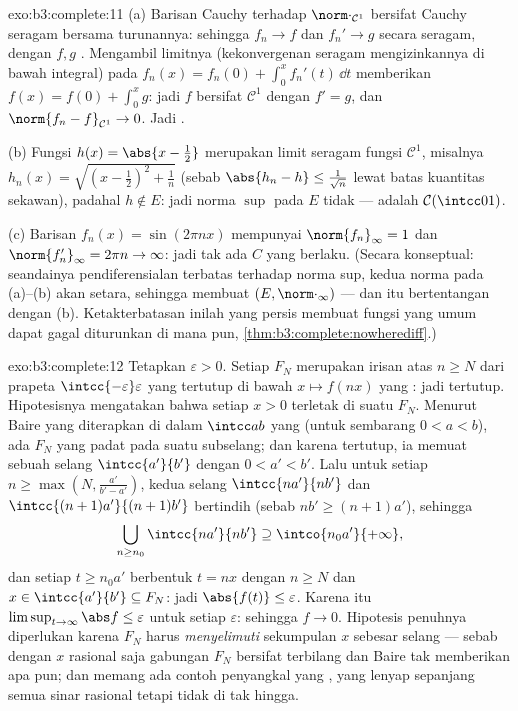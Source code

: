 \begin{solution}{exo:b3:complete:11}
(a) Barisan Cauchy terhadap $\norm\cdot_{\mathcal C^1}$ bersifat
Cauchy seragam bersama turunannya: sehingga $f_n \to f$
dan $f_n' \to g$ secara seragam, dengan $f, g$ . Mengambil
limitnya (kekonvergenan seragam mengizinkannya di bawah
integral) pada $f_n(x) = f_n(0) + \int_0^xf_n'(t)\,\dd t$
memberikan $f(x) = f(0) + \int_0^xg$: jadi $f$ bersifat $\mathcal C^1$ dengan
$f' = g$, dan $\norm{f_n - f}_{\mathcal C^1} \to 0$.
Jadi .

(b) Fungsi $h(x) = \abs{x - \frac12}$ merupakan limit seragam
fungsi $\mathcal C^1$, misalnya $h_n(x) = \sqrt{(x -
\frac12)^2 + \frac1n}$ (sebab $\abs{h_n - h} \leq \frac1{\sqrt n}$
lewat batas kuantitas sekawan), padahal $h \notin E$: jadi
norma $\sup$ pada $E$ tidak  ---  adalah
$\mathcal C(\intcc01)$.

(c) Barisan $f_n(x) = \sin(2\pi nx)$ mempunyai $\norm{f_n}_\infty = 1$ dan
$\norm{f_n'}_\infty = 2\pi n \to \infty$: jadi tak ada $C$ yang berlaku.
(Secara konseptual: seandainya pendiferensialan terbatas terhadap norma
sup, kedua norma pada (a)--(b) akan setara, sehingga membuat
$(E, \norm\cdot_\infty)$  --- dan itu bertentangan dengan (b).
Ketakterbatasan inilah yang persis membuat fungsi  yang
umum dapat gagal diturunkan di mana pun,
\cref{thm:b3:complete:nowherediff}.)
\end{solution}

\begin{solution}{exo:b3:complete:12}
Tetapkan $\varepsilon > 0$. Setiap $F_N$ merupakan irisan atas $n
\geq N$ dari prapeta $\intcc{-\varepsilon}
\varepsilon$ yang tertutup di bawah $x \mapsto f(nx)$ yang : jadi tertutup.
Hipotesisnya mengatakan bahwa setiap $x > 0$ terletak di suatu $F_N$. Menurut
Baire yang diterapkan di dalam $\intcc ab$ yang  (untuk sembarang $0 < a <
b$), ada $F_N$ yang padat pada suatu subselang; dan karena tertutup, ia
memuat sebuah selang $\intcc{a'}{b'}$ dengan $0 < a' < b'$.
Lalu untuk setiap $n \geq \max(N, \frac{a'}{b' - a'})$, kedua
selang $\intcc{na'}{nb'}$ dan $\intcc{(n+1)a'}{(n+1)b'}$
bertindih (sebab $nb' \geq (n+1)a'$), sehingga
\[
\bigcup_{n \geq n_0}\intcc{na'}{nb'} \supseteq
\intco{n_0a'}{+\infty},
\]
dan setiap $t \geq n_0a'$ berbentuk $t = nx$ dengan $n \geq N$ dan $x \in
\intcc{a'}{b'} \subseteq F_N$: jadi $\abs{f(t)} \leq \varepsilon$.
Karena itu $\limsup_{t\to\infty}\abs f \leq \varepsilon$ untuk setiap
$\varepsilon$: sehingga $f \to 0$. Hipotesis penuhnya diperlukan
karena $F_N$ harus \emph{menyelimuti} sekumpulan $x$ sebesar selang
--- sebab dengan $x$ rasional saja gabungan $F_N$ bersifat
terbilang dan Baire tak memberikan apa pun; dan memang ada
contoh penyangkal yang , yang lenyap sepanjang semua sinar
rasional tetapi tidak di tak hingga.
\end{solution}

